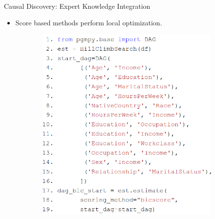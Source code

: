 \documentclass[aspectratio=169]{beamer}
\begin{document}
\begin{frame}{Causal Discovery: Expert Knowledge Integration}
	\begin{itemize}
		\item Score based methods perform local optimization.
	\end{itemize}

	\vfill

	\begin{figure}
		\begin{subfigure}{0.55 \textwidth}
			\centering
			\includegraphics[scale=0.28]{imgs/adult_start.png}
		\end{subfigure}%
		\begin{subfigure}{0.45 \textwidth}
			\centering

\end{subfigure}
\end{figure}
\end{frame}
\end{document}
